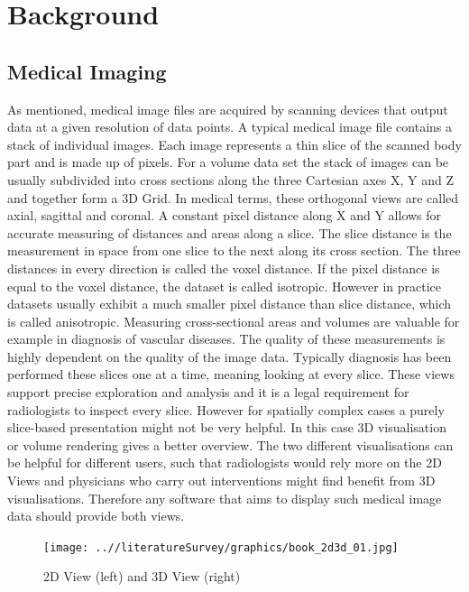 \documentclass[a4paper,11pt,titlepage]{article}
\begin{document}
\section{Background}



\subsection{Medical Imaging}



As mentioned, medical image files are acquired by scanning devices that output data at a given resolution of data points. A typical medical image file contains a stack of individual images. Each image represents a thin slice of the scanned body part and is made up of pixels. For a volume data set the stack of images can be usually subdivided into cross sections along the three Cartesian axes X, Y and Z and together form a 3D Grid. In medical terms, these orthogonal views are called axial, sagittal and coronal. A constant pixel distance along X and Y allows for accurate measuring of distances and areas along a slice. The slice distance is the measurement in space from one slice to the next along its cross section. The three distances in every direction is called the voxel distance. If the pixel distance is equal to the voxel distance, the dataset is called isotropic. However in practice datasets usually exhibit a much smaller pixel distance than slice distance, which is called anisotropic.
Measuring cross-sectional areas and volumes are valuable for example in diagnosis of vascular diseases. The quality of these measurements is highly dependent on the quality of the image data. Typically diagnosis has been performed these slices one at a time, meaning looking at every slice. These views support precise exploration and analysis and it is a legal requirement for radiologists to inspect every slice. However for spatially complex cases a purely slice-based presentation might not be very helpful. In this case 3D visualisation or volume rendering gives a better overview. The two different visualisations can be helpful for different users, such that radiologists would rely more on the 2D Views and physicians who carry out interventions might find benefit from 3D visualisations. Therefore any software that aims to display such medical image data should provide both views.


\begin{figure}[ht!]
\centering
\texttt{[image: ..//literatureSurvey/graphics/book\_2d3d\_01.jpg]}
\caption{2D View (left) and 3D View (right)}
\label{fig:UIdesign1}
\end{figure}
\end{document}
